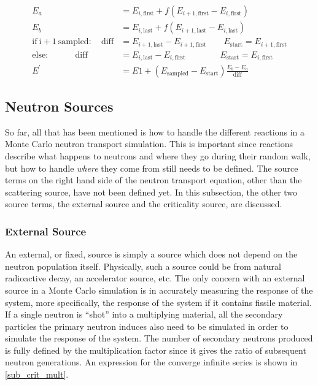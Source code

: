 \begin{equation}
\label{energy_scaling}
\begin{split}
E_a &= E_{i,\mathrm{first}} +  f( E_{i+1,\mathrm{first}} - E_{i,\mathrm{first}} ) \\
E_b &= E_{i,\mathrm{last}} +  f( E_{i+1,\mathrm{last}} - E_{i,\mathrm{last}} ) \\
\mathrm{if\:i+1\:sampled:} \quad \mathrm{diff} &= E_{i+1,\mathrm{last}}  - E_{i+1,\mathrm{first}}  \qquad E_\mathrm{start}= E_{i+1,\mathrm{first}}  \\
\mathrm{else:}          \qquad \quad       \mathrm{diff} &= E_{i,\mathrm{last}}  - E_{i,\mathrm{first}}  \qquad \qquad E_\mathrm{start}= E_{i,\mathrm{first}}  \\
E^\prime &=  E1  +  ( E_\mathrm{sampled} - E_\mathrm{start})  \frac{ E_b - E_a}{ \mathrm{diff} }  
\end{split}
\end{equation}

\subsection{Neutron Sources}

So far, all that has been mentioned is how to handle the different reactions in a Monte Carlo neutron transport simulation.  This is important since reactions describe what happens to neutrons and where they go during their random walk, but how to handle \emph{where} they come from still needs to be defined.  The source terms on the right hand side of the neutron transport equation, other than the scattering source, have not been defined yet.  In this subsection, the other two source terms, the external source and the criticality source, are discussed.

\subsubsection{External Source}

An external, or fixed, source is simply a source which does not depend on the neutron population itself.  Physically, such a source could be from natural radioactive decay, an accelerator source, etc.  The only concern with an external source in a Monte Carlo simulation is in accurately measuring the response of the system, more specifically, the response of the system if it contains fissile material.  If a single neutron is ``shot'' into a multiplying material, all the secondary particles the primary neutron induces also need to be simulated in order to simulate the response of the system.  The number of secondary neutrons produced is fully defined by the multiplication factor since it gives the ratio of subsequent neutron generations.  An expression for the converge infinite series is shown in \eqref{sub_crit_mult}\cite{duderstadt}\cite{jaakko}.

